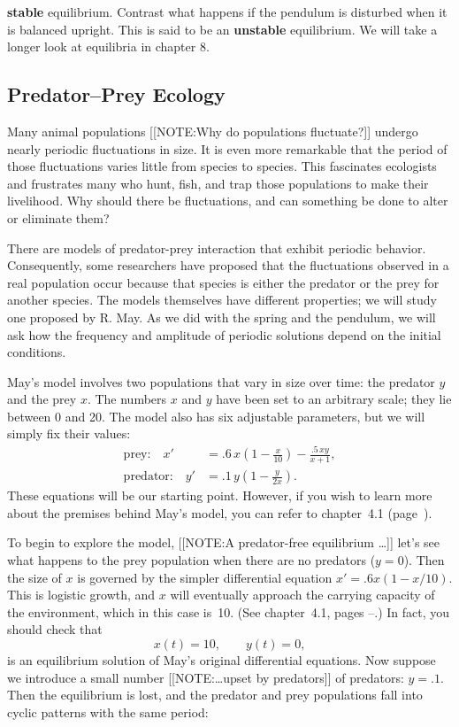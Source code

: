 {\bf stable} equilibrium.  Contrast what
happens if the pendulum is disturbed when it is balanced upright.
This is said to be an {\bf unstable}
equilibrium. We will take a longer look at
equilibria in chapter 8.


\subsection{Predator--Prey Ecology}
\label{subsec:predator--prey-ecology}

\enlargethispage*{20pt}
Many animal populations 
[[NOTE:Why do populations fluctuate?]]	
undergo nearly periodic fluctuations in size.  It is even more
remarkable that the period of those fluctuations varies little from
species to species.  This fascinates ecologists and frustrates many
who hunt, fish, and trap those populations to make their livelihood.
Why should there be fluctuations, and can something be done to alter
or eliminate them?

There are models of predator-prey interaction that exhibit periodic
behavior.  Consequently, some researchers have proposed that the
fluctuations observed in a real population occur because that species
is either the predator or the prey for another species.  The models
themselves have different properties; we will study one proposed by
R. May.  As we did with the spring and the pendulum, we
will ask how the frequency and amplitude of periodic solutions depend
on the initial conditions.

May's model involves two populations that vary in size over time: the
predator $y$ and the prey $x$.  The numbers $x$ and $y$ have been set
to an arbitrary scale; they lie between 0 and 20.  The model also has
six adjustable parameters, but we will simply fix their
values:\label{May}
\begin{align*}
\mbox{prey:} \quad x' 
   &= .6\,x\left(1-\frac{x}{10}\right) - \frac{.5\,xy}{x+1}, \\
\mbox{predator:} \quad y' 
   &= .1\,y\left(1-\frac{y}{2x}\right).
\end{align*}
These equations will be our starting point.  However, if you wish to
learn more about the premises behind May's model, you can refer to
chapter~4.1 (page~\pageref{May model}).

To begin to explore the model, 
[[NOTE:A predator-free equilibrium \ldots]]	
let's see what happens to the prey population when there are no
predators ($y = 0$).  Then the size of $x$ is governed by the simpler
differential equation $x' = .6x(1 - x/10)$.  This is logistic growth,
and $x$ will eventually approach the carrying capacity of the
environment, which in this case is~10.  (See chapter~4.1, pages
\pageref{logistic-start}--\pageref{logistic-finish}.)  In fact, you
should check that
	\[
x(t) = 10, \qquad y(t) = 0,
\]
is an equilibrium solution of May's original differential equations.
Now suppose we introduce a small number  
[[NOTE:\ldots upset by predators]]	
of predators: $y = .1$.  Then the equilibrium is lost, and the
predator and prey populations fall into cyclic patterns with the same
period:

